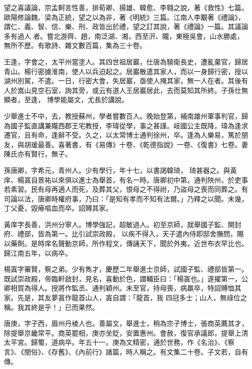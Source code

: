 \begin{pinyinscope}
 望之喜議論，宗孟軻言性善，排荀卿、揚雄、韓愈、李翱之說，著《救性》七篇。歐陽修論魏、梁為正統，望之以為非，著《明統》三篇。江南人李覯著《禮論》，謂仁、義、智、信、樂、刑、政皆出於禮，望之訂其說，著《禮論》一篇。其議論多有過人
 者。嘗北游齊、趙，南泛湖、湘，西至汧、隴，東極吳會，山水勝處，無所不歷。有歌詩、雜文數百篇，集為三十卷。



 王逢，字會之，太平州當塗人。其四世祖居巖，仕唐為驍衛長史，遭亂棄官，歸居青山。楊行密據淮南，使人以兵迫起之。居巖散遣其家人，而以一身歸行密，授以湖州別駕，不遣。一日，行密大會，失居巖，亟使人掩其家，無一人在者。其後有人於嵩山見空石室，詢其旁，或云有道人王居巖居此，去而莫知其所終。子孫仕無顯者，至逢，
 博學能屬文，尤長於講說。



 少舉進士不中，去，教授蘇州，學者嘗數百人。晚始登第，補南雄州軍事判官，歸為國子監直講兼隴西郡王宅教授，李瑋從學，事之甚謹。岐國公主既降，瑋為逢求遷官，且有命，逢辭不受。久之，以太常博士通判徐州，卒。逢為人樂易，篤於朋友，與胡瑗最善。喜著書，有《易傳》十卷、《乾德指說》一卷、《復書》七卷。妻陳氏亦有賢行，無子。



 孫唐卿，字希元，青州人。少有學行，年十七，以書謁韓琦，
 琦甚器之。與黃庠、楊寘自景祐以來俱以進士為舉首，有名一時。唐卿初中第，通判陜州，於吏事若素習。民有母再適人而死，及葬其父，恨母之不得祔，乃盜母之喪而同葬之。有司論以法，唐卿時權府事，乃曰：「是知有孝而不知有法爾。」乃釋之以聞。未幾，丁父憂，毀瘠嘔血而卒。詔賻其家。



 黃庠字長善，洪州分寧人。博學強記，超敏過人。初至京師，就舉國子監、開封府、禮部，皆為第一。比引試崇政殿，
 以疾不得入，天子遣內侍即邸舍撫問，賜以藥劑。是時庠名聲動京師，所作程文，傳誦天下，聞於外夷，近世布衣罕比也。歸江南五年，以病卒。



 楊寘字審賢，察之弟。少有雋才，慶歷二年舉進士京師，試國子監、禮部皆第一。既試崇政殿，帝臨軒啟封，見名，喜動於色，謂輔臣曰：「楊寘也。」遂擢第一，公卿相賀為得人。授將作監丞、通判穎州。未至官，持母喪，病羸卒，特詔賻恤其家。先是，其友夢寘作龍首山人，寘自謂：「龍首，我
 四冠多士；山人，無祿位之稱。我其終是乎！」已而果然。



 唐庚，字子西，眉州丹棱人也。善屬文，舉進士，稍為宗子博士，張商英薦其才，除提舉京畿常平。商英罷相，庚亦坐貶，安置惠州。會赦，復官承議郎，提舉上清太平宮。歸蜀，道病卒。年五十一。庚為文精密，通於世務，作《名治》、《察言》、《閔俗》、《存舊》、《內前行》諸篇，時人稱之。有文集二十卷。子文若，自有傳。




\end{pinyinscope}
